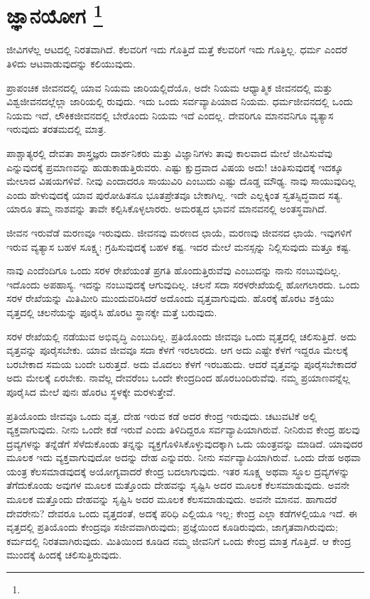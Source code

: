 
\chapter[ಜ್ಞಾನಯೋಗ ]{ಜ್ಞಾನಯೋಗ \protect\footnote{}}

ಜೀವಿಗಳೆಲ್ಲ ಆಟದಲ್ಲಿ ನಿರತವಾಗಿದೆ. ಕೆಲವರಿಗೆ ಇದು ಗೊತ್ತಿದೆ ಮತ್ತೆ ಕೆಲವರಿಗೆ ಇದು ಗೊತ್ತಿಲ್ಲ. ಧರ್ಮ ಎಂದರೆ ತಿಳಿದು ಆಟವಾಡುವುದನ್ನು ಕಲಿಯುವುದು.

ಪ್ರಾಪಂಚಿಕ ಜೀವನದಲ್ಲಿ ಯಾವ ನಿಯಮ ಜಾರಿಯಲ್ಲಿದೆಯೊ, ಅದೇ ನಿಯಮ ಆಧ್ಯಾತ್ಮಿಕ ಜೀವನದಲ್ಲಿ ಮತ್ತು ವಿಶ್ವಜೀವನದಲ್ಲೆಲ್ಲಾ ಜಾರಿಯಲ್ಲಿ ರುವುದು. ಇದು ಒಂದು ಸರ್ವವ್ಯಾಪಿಯಾದ ನಿಯಮ. ಧರ್ಮಜೀವನದಲ್ಲಿ ಒಂದು ನಿಯಮ ಇದೆ, ಲೌಕಿಕಜೀವನದಲ್ಲಿ ಬೇರೊಂದು ನಿಯಮ ಇದೆ ಎಂದಲ್ಲ. ದೇವರಿಗೂ ಮಾನವನಿಗೂ ವ್ಯತ್ಯಾಸ ಇರುವುದು ತರತಮದಲ್ಲಿ ಮಾತ್ರ.

ಪಾಶ್ಚಾತ್ಯರಲ್ಲಿ ದೇವತಾ ಶಾಸ್ತ್ರಜ್ಞರು ದಾರ್ಶನಿಕರು ಮತ್ತು ವಿಜ್ಞಾನಿಗಳು ತಾವು ಕಾಲವಾದ ಮೇಲೆ ಜೀವಿಸುವೆವು ಎನ್ನುವುದಕ್ಕೆ ಪ್ರಮಾಣವನ್ನು ಹುಡುಕಾಡುತ್ತಿರುವರು. ಎಷ್ಟು ಕ್ಷುದ್ರವಾದ ವಿಷಯ ಅದು! ಚಿಂತಿಸುವುದಕ್ಕೆ ಇದಕ್ಕೂ ಮೇಲಾದ ವಿಷಯಗಳಿವೆ. ನೀವು ಎಂದಾದರೂ ಸಾಯುವಿರಿ ಎಂಬುದು ಎಷ್ಟು ದೊಡ್ಡ ಮೌಢ್ಯ. ನಾವು ಸಾಯುವುದಿಲ್ಲ ಎಂದು ಹೇಳುವುದಕ್ಕೆ ಯಾವ ಪುರೋಹಿತನೂ ಭೂತಪ್ರೇತವೂ ಬೇಕಾಗಿಲ್ಲ. ಇದೇ ಎಲ್ಲಕ್ಕಿಂತ ಸ್ವತಸ್ಸಿದ್ಧವಾದ ಸತ್ಯ. ಯಾರೂ ತಮ್ಮ ನಾಶವನ್ನು ತಾವೇ ಕಲ್ಪಿಸಿಕೊಳ್ಳಲಾರರು. ಅಮರತ್ವದ ಭಾವನೆ ಮಾನವನಲ್ಲಿ ಅಂತಸ್ಥವಾಗಿದೆ.

ಜೀವನ ಇರುವೆಡೆ ಮರಣವೂ ಇರುವುದು. ಜೀವನವು ಮರಣದ ಛಾಯೆ, ಮರಣವು ಜೀವನದ ಛಾಯೆ. ಇವುಗಳಿಗೆ ಇರುವ ವ್ಯತ್ಯಾಸ ಬಹಳ ಸೂಕ್ಷ್ಮ; ಗ್ರಹಿಸುವುದಕ್ಕೆ ಬಹಳ ಕಷ್ಟ. ಇದರ ಮೇಲೆ ಮನಸ್ಸನ್ನು ನಿಲ್ಲಿಸುವುದು ಮತ್ತೂ ಕಷ್ಟ.

ನಾವು ಎಂದೆಂದಿಗೂ ಒಂದು ಸರಳ ರೇಖೆಯಂತೆ ಪ್ರಗತಿ ಹೊಂದುತ್ತಿರುವೆವು ಎಂಬುದನ್ನು ನಾನು ನಂಬುವುದಿಲ್ಲ. ಇದೊಂದು ಅಪಹಾಸ್ಯ. ಇದನ್ನು ನಂಬುವುದಕ್ಕೆ ಆಗುವುದಿಲ್ಲ. ಚಲನೆ ಸದಾ ಸರಳರೇಖೆಯಲ್ಲಿ ಹೋಗಲಾರದು. ಒಂದು ಸರಳ ರೇಖೆಯನ್ನು ಮಿತಿಮೀರಿ ಮುಂದುವರಿಸಿದರೆ ಅದೊಂದು ವೃತ್ತವಾಗುವುದು. ಹೊರಕ್ಕೆ ಹೊರಟ ಶಕ್ತಿಯು ವೃತ್ತದಲ್ಲಿ ಚಲನೆಯನ್ನು ಪೂರೈಸಿ ಹೊರಟ ಸ್ಥಾನಕ್ಕೇ ಮತ್ತೆ ಬರುವುದು.

ಸರಳ ರೇಖೆಯಲ್ಲಿ ನಡೆಯುವ ಅಭಿವೃದ್ಧಿ ಎಂಬುದಿಲ್ಲ. ಪ್ರತಿಯೊಂದು ಜೀವವೂ ಒಂದು ವೃತ್ತದಲ್ಲಿ ಚಲಿಸುತ್ತಿದೆ. ಅದು ವೃತ್ತವನ್ನು ಪೂರೈಸಬೇಕು. ಯಾವ ಜೀವವೂ ಸದಾ ಕೆಳಗೆ ಇರಲಾರದು. ಆಗ ಅದು ಎಷ್ಟೇ ಕೆಳಗೆ ಇದ್ದರೂ ಮೇಲಕ್ಕೆ ಬರಬೇಕಾದ ಸಮಯ ಬಂದೇ ಬರುತ್ತದೆ. ಅದು ಮೊದಲು ಕೆಳಗೆ ಇರಬಹುದು. ಆದರೆ ವೃತ್ತವನ್ನು ಪೂರೈಸಬೇಕಾದರೆ ಅದು ಮೇಲಕ್ಕೆ ಏರಬೇಕು. ನಾವೆಲ್ಲ ದೇವರೆಂಬ ಒಂದೇ ಕೇಂದ್ರದಿಂದ ಹೊರಬಂದಿರುವೆವು. ನಮ್ಮ ಪ್ರಯಾಣವನ್ನೆಲ್ಲ ಪೂರೈಸಿದ ಮೇಲೆ ಪುನಃ ಹೊರಟ ಸ್ಥಳಕ್ಕೇ ಮರಳುತ್ತೇವೆ.

ಪ್ರತಿಯೊಂದು ಜೀವವೂ ಒಂದು ವೃತ್ತ. ದೇಹ ಇರುವ ಕಡೆ ಅದರ ಕೇಂದ್ರ ಇರುವುದು. ಚಟುವಟಿಕೆ ಅಲ್ಲಿ ವ್ಯಕ್ತವಾಗುವುದು. ನೀನು ಒಂದೇ ಕಡೆ ಇರುವೆ ಎಂದು ತಿಳಿದಿದ್ದರೂ ಸರ್ವವ್ಯಾಪಿಯಾಗಿರುವೆ. ನೀನಿರುವ ಕೇಂದ್ರ ಹಲವು ದ್ರವ್ಯಗಳನ್ನು ತನ್ನೆಡೆಗೆ ಸೆಳೆದುಕೊಂಡು ತನ್ನನ್ನು ವ್ಯಕ್ತಗೊಳಿಸಿಕೊಳ್ಳುವುದಕ್ಕಾಗಿ ಒದು ಯಂತ್ರವನ್ನು ಮಾಡಿದೆ. ಯಾವುದರ ಮೂಲಕ ಇದು ವ್ಯಕ್ತವಾಗುವುದೋ ಅದನ್ನು ದೇಹ ಎನ್ನುವರು. ನೀನು ಸರ್ವವ್ಯಾಪಿಯಾಗಿರುವೆ. ಒಂದು ದೇಹ ಅಥವಾ ಯಂತ್ರ ಕೆಲಸಮಾಡವುದಕ್ಕೆ ಅಯೋಗ್ಯವಾದರೆ ಕೇಂದ್ರ ಬದಲಾಗುವುದು. ಇತರ ಸೂಕ್ಷ್ಮ ಅಥವಾ ಸ್ಥೂಲ ದ್ರವ್ಯಗಳನ್ನು ತೆಗೆದುಕೊಂಡು ಅವುಗಳ ಮೂಲಕ ಮತ್ತೊಂದು ದೇಹವನ್ನು ಸೃಷ್ಟಿಸಿ ಅದರ ಮೂಲಕ ಕೆಲಸಮಾಡುವುದು. ಅವನೇ ಮೂಲಕ ಮತ್ತೊಂದು ದೇಹವನ್ನು ಸೃಷ್ಟಿಸಿ ಅದರ ಮೂಲಕ ಕೆಲಸಮಾಡುವುದು. ಅವನೇ ಮಾನವ. ಹಾಗಾದರೆ ದೇವರೇನು? ದೇವರೂ ಒಂದು ವೃತ್ತದಂತೆ, ಅದಕ್ಕೆ ಪರಿಧಿ ಎಲ್ಲಿಯೂ ಇಲ್ಲ; ಕೇಂದ್ರ ಎಲ್ಲಾ ಕಡೆಗಳಲ್ಲಿಯೂ ಇದೆ. ಈ ವೃತ್ತದಲ್ಲಿ ಪ್ರತಿಯೊಂದು ಕೇಂದ್ರವೂ ಸಜೀವವಾಗಿರುವುದು; ಪ್ರಜ್ಞೆಯಿಂದ ಕೂಡಿರುವುದು, ಜಾಗೃತವಾಗಿರುವುದು; ಕರ್ಮದಲ್ಲಿ ನಿರತವಾಗಿರುವುದು. ಮಿತಿಯಿಂದ ಕೂಡಿದ ನಮ್ಮ ಜೀವನಿಗೆ ಒಂದು ಕೇಂದ್ರ ಮಾತ್ರ ಗೊತ್ತಿದೆ. ಆ ಕೇಂದ್ರ ಮುಂದಕ್ಕೆ ಹಿಂದಕ್ಕೆ ಚಲಿಸುತ್ತಿರುವುದು.

